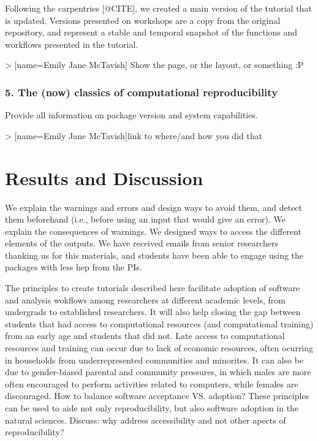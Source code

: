 \documentclass[12pt]{article}
\begin{document}
Following the carpentries [@CITE], we created a main version of the tutorial that is updated. Versions presented on workshops are a copy from the original repository, and represent a stable and temporal snapshot of the functions and workflows presented in the tutorial.

> [name=Emily Jane McTavish] Show the page, or the layout, or something :P


\subsubsection*{5. The (now) classics of computational reproducibility}

Provide all information on package version and system capabilities.

> [name=Emily Jane McTavish]link to where/and how you did that

\section{Results and Discussion}
\label{sec:results}

We explain the warnings and errors and design ways to avoid them, and detect them beforehand (i.e., before using an input that would give an error). We explain the consequences of warnings.
We designed ways to access the different elements of the outputs.
We have received emails from senior researchers thanking us for this materials, and students have been able to engage using the packages with less hep from the PIs.

The principles to create tutorials described here facilitate adoption of software and analysis wokflows among researchers at different academic levels, from undergrads to established researchers.
It will also help closing the gap between students that had access to computational resources (and computational training) from an early age and students that did not. Late access to computational resources and training can occur due to lack of economic resources, often ocurring in households from underrepresented communities and minorites. It can also be due to gender-biased parental and community pressures, in which males are more often encouraged to perform activities related to computers, while females are discouraged.
How to balance software acceptance VS. adoption?
These principles can be used to aide not only reproducibility, but also software adoption in the natural sciences.
Discuss: why address accessibility and not other apects of reproducibility?
\end{document}
